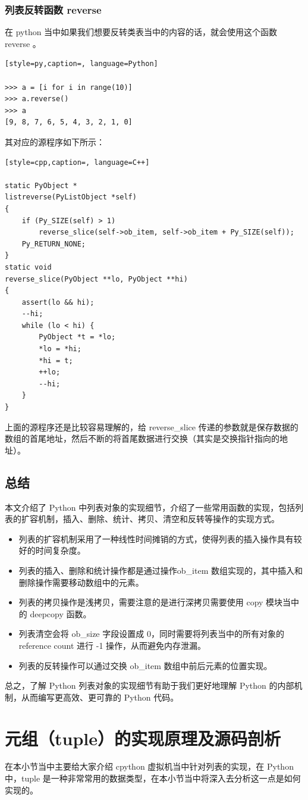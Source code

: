 \subsubsection{列表反转函数 reverse}
在 python 当中如果我们想要反转类表当中的内容的话，就会使用这个函数 reverse 。
\begin{lstlisting}[style=py,caption=, language=Python]

>>> a = [i for i in range(10)]
>>> a.reverse()
>>> a
[9, 8, 7, 6, 5, 4, 3, 2, 1, 0]
\end{lstlisting}
其对应的源程序如下所示：
\begin{lstlisting}[style=cpp,caption=, language=C++]

static PyObject *
listreverse(PyListObject *self)
{
    if (Py_SIZE(self) > 1)
        reverse_slice(self->ob_item, self->ob_item + Py_SIZE(self));
    Py_RETURN_NONE;
}
static void
reverse_slice(PyObject **lo, PyObject **hi)
{
    assert(lo && hi);
    --hi;
    while (lo < hi) {
        PyObject *t = *lo;
        *lo = *hi;
        *hi = t;
        ++lo;
        --hi;
    }
}
\end{lstlisting}
上面的源程序还是比较容易理解的，给 reverse\_slice 传递的参数就是保存数据的数组的首尾地址，然后不断的将首尾数据进行交换（其实是交换指针指向的地址）。
\subsection{总结}
本文介绍了 Python 中列表对象的实现细节，介绍了一些常用函数的实现，包括列表的扩容机制，插入、删除、统计、拷贝、清空和反转等操作的实现方式。
\begin{itemize}
\item 列表的扩容机制采用了一种线性时间摊销的方式，使得列表的插入操作具有较好的时间复杂度。 
\item 列表的插入、删除和统计操作都是通过操作ob\_item 数组实现的，其中插入和删除操作需要移动数组中的元素。 
\item 列表的拷贝操作是浅拷贝，需要注意的是进行深拷贝需要使用 copy 模块当中的 deepcopy 函数。 
\item 列表清空会将 ob\_size 字段设置成 0，同时需要将列表当中的所有对象的 reference count 进行 -1 操作，从而避免内存泄漏。 
\item 列表的反转操作可以通过交换 ob\_item 数组中前后元素的位置实现。 
\end{itemize}
总之，了解 Python 列表对象的实现细节有助于我们更好地理解 Python 的内部机制，从而编写更高效、更可靠的 Python 代码。

\section{元组（tuple）的实现原理及源码剖析}
在本小节当中主要给大家介绍 cpython 虚拟机当中针对列表的实现，在 Python 中，tuple 是一种非常常用的数据类型，在本小节当中将深入去分析这一点是如何实现的。
